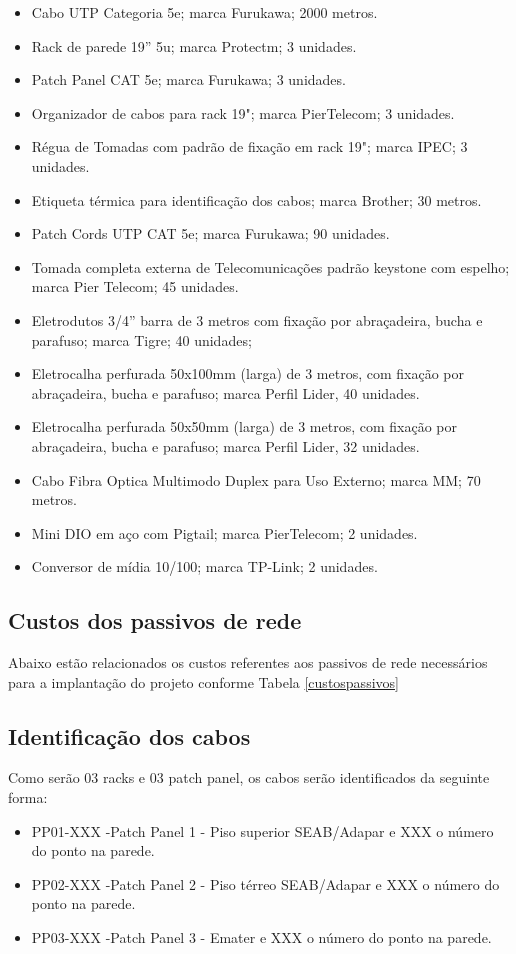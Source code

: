 \documentclass[	DIV=calc,%
							paper=a4,%
							fontsize=12pt,%
							onecolumn]{scrartcl}	 					%
\begin{document}
\begin{itemize}
	\item Cabo UTP Categoria 5e; marca Furukawa; 2000 metros.
	\item Rack de parede 19” 5u; marca Protectm; 3 unidades.
	\item Patch Panel CAT 5e; marca Furukawa; 3 unidades.
	\item Organizador de cabos para rack 19"; marca PierTelecom; 3 unidades.
	\item Régua de Tomadas com padrão de fixação em rack 19"; marca IPEC; 3 unidades.
	\item Etiqueta térmica para identificação dos cabos; marca Brother; 30 metros.
	\item Patch Cords UTP CAT 5e; marca Furukawa; 90 unidades.
	\item Tomada completa externa de Telecomunicações padrão keystone com espelho; marca Pier Telecom; 45 unidades.
	\item Eletrodutos 3/4” barra de 3 metros com fixação por abraçadeira, bucha e parafuso; marca Tigre; 40 unidades;  
	\item Eletrocalha perfurada 50x100mm (larga) de 3 metros, com fixação por abraçadeira, bucha e parafuso; marca Perfil Lider, 40 unidades.
	\item Eletrocalha perfurada 50x50mm (larga) de 3 metros, com fixação por abraçadeira, bucha e parafuso; marca Perfil Lider, 32 unidades.
	\item Cabo Fibra Optica Multimodo Duplex para Uso Externo; marca MM; 70 metros.
	\item Mini DIO em aço com Pigtail; marca PierTelecom; 2 unidades.
	\item Conversor de mídia 10/100; marca TP-Link; 2 unidades.
	
\end{itemize}	

\subsection{Custos dos passivos de rede}
Abaixo estão relacionados os custos referentes aos passivos de rede necessários para a implantação do projeto conforme  Tabela \ref{custospassivos}


\subsection{Identificação dos cabos}
Como serão 03 racks e 03 patch panel, os cabos serão identificados da seguinte forma: 
\begin{itemize}
\item PP01-XXX -Patch Panel 1 - Piso superior SEAB/Adapar e XXX o número do ponto na parede.
\item PP02-XXX -Patch Panel 2 - Piso térreo SEAB/Adapar e XXX o número do ponto na parede.
\item PP03-XXX -Patch Panel 3 - Emater e  XXX o número do ponto na parede.
\end{itemize}
\end{document}
